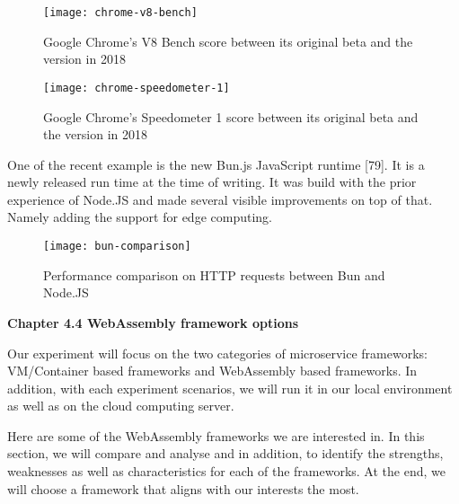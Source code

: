 \bigskip
\begin{figure}[hp]
\centering
\texttt{[image: chrome-v8-bench]}
\caption{\footnotesize{Google Chrome's V8 Bench score between its original beta and the version in 2018}}
\captionsetup{aboveskip=0pt,font=it}
\end{figure}

\newpage
\begin{figure}[hp]
\centering
\texttt{[image: chrome-speedometer-1]}
\caption{\footnotesize{Google Chrome's Speedometer 1 score between its original beta and the version in 2018}}
\captionsetup{aboveskip=0pt,font=it}
\end{figure}
\bigskip

One of the recent example is the new Bun.js JavaScript runtime [79]. It is a newly released run time at the time of writing. It was build with the prior experience of Node.JS and made several visible improvements on top of that. Namely adding the support for edge computing.

\bigskip
\begin{figure}[hp]
\centering
\texttt{[image: bun-comparison]}
\caption{\footnotesize{Performance comparison on HTTP requests between Bun and Node.JS}}
\captionsetup{aboveskip=0pt,font=it}
\end{figure}
\bigskip

\bigskip
\textbf{{\Large Chapter 4.4 WebAssembly framework options}}

Our experiment will focus on the two categories of microservice frameworks: VM/Container based frameworks and WebAssembly based frameworks. In addition, with each experiment scenarios, we will run it in our local environment as well as on the cloud computing server.

Here are some of the WebAssembly frameworks we are interested in. In this section, we will compare and analyse and in addition, to identify the strengths, weaknesses as well as characteristics for each of the frameworks. At the end, we will choose a framework that aligns with our interests the most.

